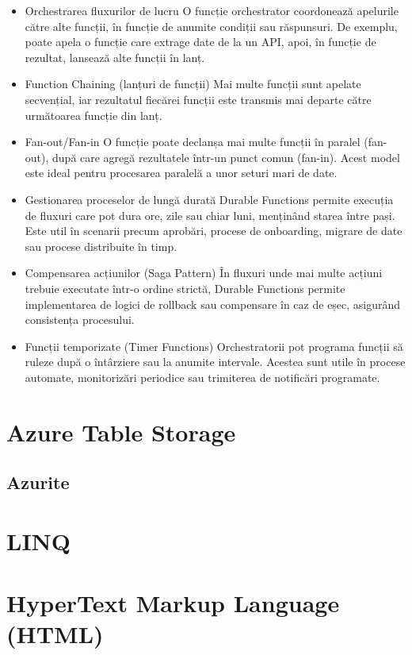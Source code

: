 \begin{itemize}
    \item Orchestrarea fluxurilor de lucru
          O funcție orchestrator coordonează apelurile către alte funcții, în funcție de anumite condiții sau răspunsuri. De exemplu, poate apela o funcție care extrage date de la un API, apoi, în funcție de rezultat, lansează alte funcții în lanț.
    \item 	Function Chaining (lanțuri de funcții)
          Mai multe funcții sunt apelate secvențial, iar rezultatul fiecărei funcții este transmis mai departe către următoarea funcție din lanț.
    \item 	Fan-out/Fan-in
          O funcție poate declanșa mai multe funcții în paralel (fan-out), după care agregă rezultatele într-un punct comun (fan-in). Acest model este ideal pentru procesarea paralelă a unor seturi mari de date.
    \item 	Gestionarea proceselor de lungă durată
          Durable Functions permite execuția de fluxuri care pot dura ore, zile sau chiar luni, menținând starea între pași. Este util în scenarii precum aprobări, procese de onboarding, migrare de date sau procese distribuite în timp.
    \item 	Compensarea acțiunilor (Saga Pattern)
          În fluxuri unde mai multe acțiuni trebuie executate într-o ordine strictă, Durable Functions permite implementarea de logici de rollback sau compensare în caz de eșec, asigurând consistența procesului.
    \item 	Funcții temporizate (Timer Functions)
          Orchestratorii pot programa funcții să ruleze după o întârziere sau la anumite intervale. Acestea sunt utile în procese automate, monitorizări periodice sau trimiterea de notificări programate.
\end{itemize}\parencite{azureDurableFunctions}

\section{Azure Table Storage}
\subsection{Azurite}
\section{LINQ}
\section{HyperText Markup Language (HTML)}
